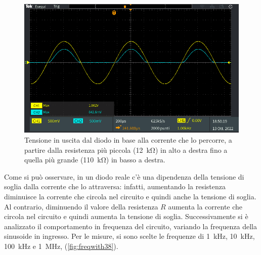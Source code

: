 \begin{figure}[!ht]
\begin{minipage}{.496\textwidth}
\end{minipage}
\begin{minipage}{.496\textwidth}
	\includegraphics[width=\linewidth]{./ImageFiles/Laboratorio 2/TEK00007.PNG}
\end{minipage}
	\caption{Tensione in uscita dal diodo in base alla corrente che lo percorre, a partire dalla resistenza più piccola (\SI{12}{\kilo\ohm}) in alto a destra fino a quella più grande (\SI{110}{\kilo\ohm}) in basso a destra.}
	\label{fig:voutvsresistance}
\end{figure}
Come si può osservare, in un diodo reale c'è una dipendenza della tensione di soglia dalla corrente che lo attraversa: infatti, aumentando la resistenza diminuisce la corrente che circola nel circuito e quindi anche la tensione di soglia. Al contrario, diminuendo il valore della resistenza $R$ aumenta la corrente che circola nel circuito e quindi aumenta la tensione di soglia.
Successivamente si è analizzato il comportamento in frequenza del circuito, variando la frequenza della sinusoide in ingresso. Per le misure, si sono scelte le frequenze di \SI{1}{\kilo\hertz}, \SI{10}{\kilo\hertz}, \SI{100}{\kilo\hertz} e \SI{1}{\mega\hertz}, (\Fig\ref{fig:freqwith38}).
